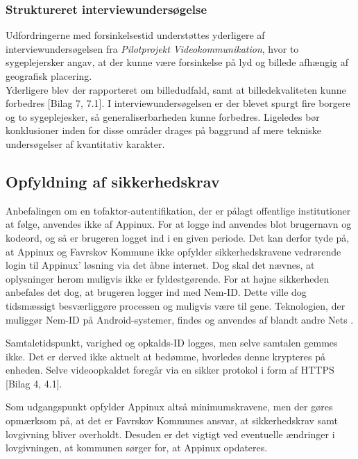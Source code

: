 \subsubsection{Struktureret interviewundersøgelse}
Udfordringerne med forsinkelsestid understøttes yderligere af interviewundersøgelsen fra \textit{Pilotprojekt Videokommunikation}, hvor to sygeplejersker angav, at der kunne være forsinkelse på lyd og billede afhængig af geografisk placering. \\Yderligere blev der rapporteret om billedudfald, samt at billedekvaliteten kunne forbedres [Bilag 7, 7.1]. I interviewundersøgelsen er der blevet spurgt fire borgere og to sygeplejesker, så generaliserbarheden kunne forbedres. Ligeledes bør konklusioner inden for disse områder drages på baggrund af mere tekniske undersøgelser af kvantitativ karakter.


\subsection{Opfyldning af sikkerhedskrav}
Anbefalingen om en tofaktor-autentifikation, der er pålagt offentlige institutioner at følge, anvendes ikke af Appinux. For at logge ind anvendes blot brugernavn og kodeord, og så er brugeren logget ind i en given periode. Det kan derfor tyde på, at Appinux og Favrskov Kommune ikke opfylder sikkerhedskravene vedrørende login til Appinux' løsning via det åbne internet. Dog skal det nævnes, at oplysninger herom muligvis ikke er fyldestgørende. For at højne sikkerheden anbefales det dog, at brugeren logger ind med Nem-ID. Dette ville dog tidsmæssigt besværliggøre processen og muligvis være til gene. Teknologien, der muliggør Nem-ID på Android-systemer, findes og anvendes af blandt andre Nets \cite{netsapp}.

Samtaletidspunkt, varighed og opkalds-ID logges, men selve samtalen gemmes ikke. Det er derved ikke aktuelt at bedømme, hvorledes denne krypteres på enheden. Selve videoopkaldet foregår via en sikker protokol i form af HTTPS [Bilag 4, 4.1].

Som udgangspunkt opfylder Appinux altså minimumskravene, men der gøres opmærksom på, at det er Favrskov Kommunes ansvar, at sikkerhedskrav samt lovgivning bliver overholdt. Desuden er det vigtigt ved eventuelle ændringer i lovgivningen, at kommunen sørger for, at Appinux opdateres.

